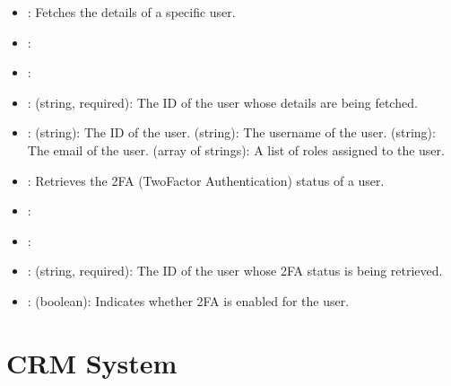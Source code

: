 \documentclass[letterpaper,10pt,english]{sphinxmanual}
\begin{document}
\sphinxAtStartPar
{}
\begin{itemize}
\item {} 
\sphinxAtStartPar
{}: Fetches the details of a specific user.

\item {} 
\sphinxAtStartPar
{}: 

\item {} 
\sphinxAtStartPar
{}: 

\item {} 
\sphinxAtStartPar
{}:
\sphinxhyphen{}  (string, required): The ID of the user whose details are being fetched.

\item {} 
\sphinxAtStartPar
{}:
\sphinxhyphen{}  (string): The ID of the user.
\sphinxhyphen{}  (string): The username of the user.
\sphinxhyphen{}  (string): The email of the user.
\sphinxhyphen{}  (array of strings): A list of roles assigned to the user.

\end{itemize}

\sphinxAtStartPar
{}
\begin{itemize}
\item {} 
\sphinxAtStartPar
{}: Retrieves the 2FA (Two\sphinxhyphen{}Factor Authentication) status of a user.

\item {} 
\sphinxAtStartPar
{}: 

\item {} 
\sphinxAtStartPar
{}: 

\item {} 
\sphinxAtStartPar
{}:
\sphinxhyphen{}  (string, required): The ID of the user whose 2FA status is being retrieved.

\item {} 
\sphinxAtStartPar
{}:
\sphinxhyphen{}  (boolean): Indicates whether 2FA is enabled for the user.

\end{itemize}

\sphinxstepscope


\chapter{CRM System}
\label{\detokenize{crm_system/index:crm-system}}\label{\detokenize{crm_system/index::doc}}


\renewcommand{\indexname}{Index}
\printindex
\end{document}
